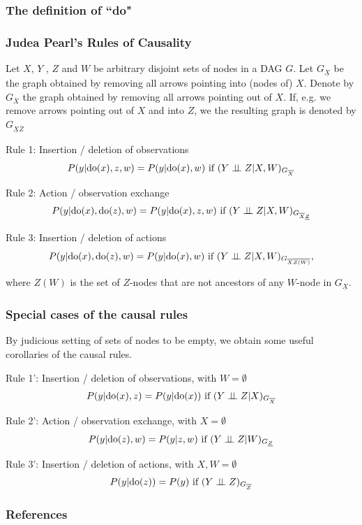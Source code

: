 \begin{frame}
    \frametitle{The definition of ``do"}
\end{frame}
\begin{frame}
\frametitle{Judea Pearl's Rules of Causality}

Let $X$, $Y$ , $Z$ and $W$ be arbitrary disjoint sets of nodes in a DAG $G$. Let $G_\underline{X}$ be the graph obtained by removing all arrows pointing into (nodes of) $X$. 
Denote by $G_{\overline{X}}$ the graph obtained by removing all arrows pointing out of $X$. If, e.g. we remove arrows pointing out of $X$ and into $Z$, we the resulting graph is denoted by $G_{\underline{X} \overline{Z}}$

Rule 1: Insertion / deletion of observations
\begin{equation*}
P(y | \mathrm{do}(x), z, w) = P(y | \mathrm{do}(x), w) \textrm{ if } (Y \perp\!\!\!\perp Z | X, W)_{G_{\overline{X}}}
\end{equation*}

Rule 2: Action / observation exchange
\begin{equation*}
P(y | \mathrm{do}(x), \mathrm{do}(z), w) = P(y | \mathrm{do}(x), z, w) \textrm{ if } (Y \perp\!\!\!\perp Z | X, W)_{G_{\overline{X} \underline{Z}}}
\end{equation*}

Rule 3: Insertion / deletion of actions
\begin{equation*}
P(y | \mathrm{do}(x), \mathrm{do}(z), w) = P(y | \mathrm{do}(x), w) \textrm{ if } (Y \perp\!\!\!\perp Z | X, W)_{G_{\overline{X} \overline{Z(W)}}},
\end{equation*}

where $Z(W)$ is the set of $Z$-nodes that are not ancestors of any $W$-node in $G_\underline{X}$.

\end{frame}

\begin{frame}
\frametitle{Special cases of the causal rules}

By judicious setting of sets of nodes to be empty, we obtain some useful corollaries of the causal rules.
\newline

Rule 1': Insertion / deletion of observations, with $W = \emptyset$
\begin{equation*}
    P(y | \mathrm{do}(x), z) = P(y | \mathrm{do}(x)) \textrm{ if } (Y \perp\!\!\!\perp Z | X)_{G_{\overline{X}}}
\end{equation*}

Rule 2': Action / observation exchange, with $X = \emptyset$
\begin{equation*}
P(y | \mathrm{do}(z), w) = P(y | z, w) \textrm{ if } (Y \perp\!\!\!\perp Z | W)_{G_{ \underline{Z}}}
\end{equation*}

Rule 3': Insertion / deletion of actions, with $X, W = \emptyset$
\begin{equation*}
P(y | \mathrm{do}(z)) = P(y) \textrm{ if } (Y \perp\!\!\!\perp Z )_{G_{\overline{Z}}}
\end{equation*}

\end{frame}

\begin{frame}[allowframebreaks]
    \frametitle{References}
    
    
\end{frame}

